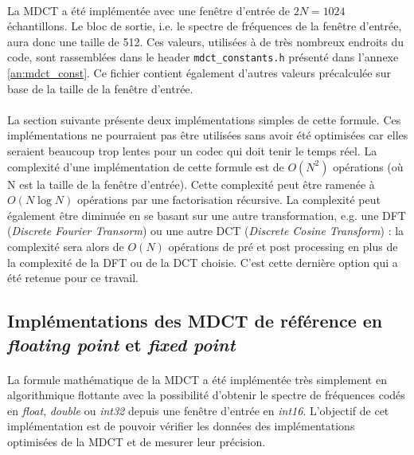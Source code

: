 \documentclass{article}
\begin{document}
    \paragraph{}
    La MDCT a été implémentée avec une fenêtre d'entrée de $2N = 1024$ échantillons. Le bloc de sortie, i.e. le spectre de fréquences de la fenêtre d'entrée, aura donc une taille de 512. Ces valeurs, utilisées à de très nombreux endroits du code, sont rassemblées dans le header \texttt{mdct\_constants.h} présenté dans l'annexe \ref{an:mdct_const}. Ce fichier contient également d'autres valeurs précalculée sur base de la taille de la fenêtre d'entrée.

    \paragraph{}
    La section suivante présente deux implémentations simples de cette formule. Ces implémentations ne pourraient pas être utilisées sans avoir été optimisées car elles seraient beaucoup trop lentes pour un codec qui doit tenir le temps réel. La complexité d'une implémentation de cette formule est de $O(N^2)$ opérations (où N est la taille de la fenêtre d'entrée). Cette complexité peut être ramenée à $O(N \log N)$ opérations par une factorisation récursive. La complexité peut également être diminuée en se basant sur une autre transformation, e.g. une DFT (\emph{Discrete Fourier Transorm}) ou une autre DCT (\emph{Discrete Cosine Transform}) : la complexité sera alors de $O(N)$ opérations de pré et post processing en plus de la complexité de la DFT ou de la DCT choisie\cite{wiki:MDCT}. C'est cette dernière option qui a été retenue pour ce travail.

    \subsection{Implémentations des MDCT de référence en \emph{floating point} et \emph{fixed point}}
    \paragraph{}
    La formule mathématique de la MDCT a été implémentée très simplement en algorithmique flottante avec la possibilité d'obtenir le spectre de fréquences codés en \emph{float}, \emph{double} ou \emph{int32} depuis une fenêtre d'entrée en \emph{int16}. L'objectif de cet implémentation est de pouvoir vérifier les données des implémentations optimisées de la MDCT et de mesurer leur précision.
\end{document}
